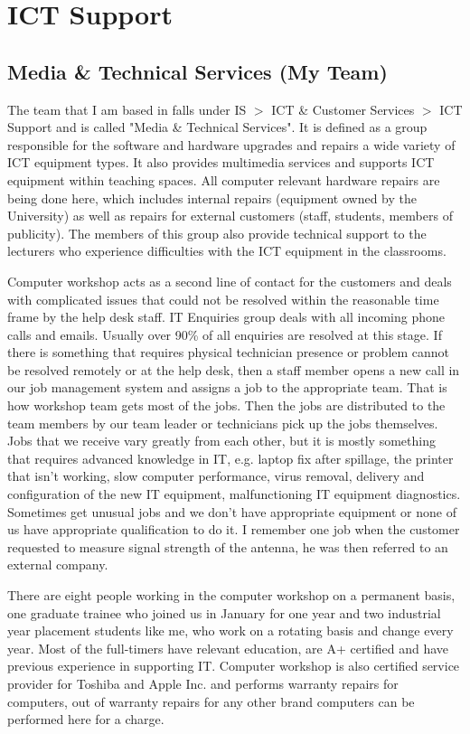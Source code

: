 \documentclass[10pt,a4paper,headinclude=true]{report}
\begin{document}
\section{ICT Support}
\subsection{Media \& Technical Services (My Team)}
The team that I am based in falls under IS $>$ ICT \& Customer Services $>$ ICT Support and is called "Media \& Technical Services". It is defined as a group responsible for the software and hardware upgrades and repairs a wide variety of ICT equipment types. It also provides multimedia services and supports ICT equipment within teaching spaces. All computer relevant hardware repairs are being done here, which includes internal repairs (equipment owned by the University) as well as repairs for external customers (staff, students, members of publicity). The members of this group also provide technical support to the lecturers who experience difficulties with the ICT equipment in the classrooms. 

Computer workshop acts as a second line of contact for the customers and deals with complicated issues that could not be resolved within the reasonable time frame by the help desk staff. IT Enquiries group deals with all incoming phone calls and emails. Usually over 90\% of all enquiries are resolved at this stage. If there is something that requires physical technician presence or problem cannot be resolved remotely or at the help desk, then a staff member opens a new call in our job management system and assigns a job to the appropriate team. That is how workshop team gets most of the jobs. Then the jobs are distributed to the team members by our team leader or technicians pick up the jobs themselves. Jobs that we receive vary greatly from each other, but it is mostly something that requires advanced knowledge in IT, e.g. laptop fix after spillage, the printer that isn't working, slow computer performance, virus removal, delivery and configuration of the new IT equipment, malfunctioning IT equipment diagnostics. Sometimes get unusual jobs and we don't have appropriate equipment or none of us have appropriate qualification to do it. I remember one job when the customer requested to measure signal strength of the antenna, he was then referred to an external company.

There are eight people working in the computer workshop on a permanent basis, one graduate trainee who joined us in January for one year and two industrial year placement students like me, who work on a rotating basis and change every year. Most of the full-timers have relevant education, are A+ certified\cite{A+} and have previous experience in supporting IT. Computer workshop is also certified service provider for Toshiba and Apple Inc. and performs warranty repairs for computers, out of warranty repairs for any other brand computers can be performed here for a charge. 
\end{document}
